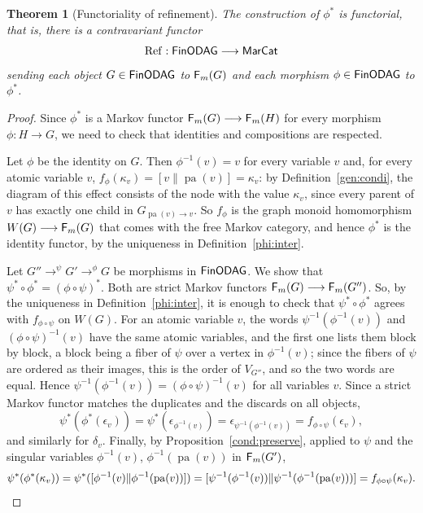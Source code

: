 \documentclass[12pt]{amsart}
\theoremstyle{plain}
\newtheorem{thm}{Theorem}[section]
\theoremstyle{definition}
\theoremstyle{remark}
\numberwithin{equation}{section}
\theoremstyle{plain}
\newcommand{\0}{\emptyset}
\newcommand{\fun}{\longrightarrow}
\newcommand{\cat}[1]{\textup{\textsf{#1}}}
\DeclareMathOperator{\cau}{\cat F_{\text{$m$}}}
\DeclareMathOperator{\pa}{pa}
\DeclareMathOperator{\intv}{Ref}
\begin{document}
%
%



\begin{thm}[Functoriality of refinement]\label{int:func}
The construction of $\phi^*$ is functorial, that is, there is a contravariant  functor
\[
\intv : \cat{FinODAG} \fun \cat{MarCat}
\]
sending each object  $G \in  \cat{FinODAG}$ to $\cau(G)$ and each morphism $\phi \in  \cat{FinODAG}$ to $\phi^*$.
\end{thm}
\begin{proof}
Since $\phi^*$ is a Markov functor $\cau(G) \fun \cau(H)$ for every morphism $\phi : H \fun G$, we need to check that identities and compositions are respected.

Let $\phi$ be the identity on $G$. Then $\phi^{-1}(v) = v$ for every variable $v$ and, for every atomic variable $v$, $f_\phi(\kappa_v) = [v \| \pa(v)] = \kappa_v$: by Definition~\ref{gen:condi}, the diagram of this effect consists of the node with the value $\kappa_v$, since every parent of $v$ has exactly one child in $G_{\pa(v) \rightarrow v}$. So $f_\phi$ is the graph monoid homomorphism $W(G) \fun \cau(G)$ that comes with the free Markov category, and hence $\phi^*$ is the identity functor, by the uniqueness in Definition~\ref{phi:inter}.

Let $G'' \to^\psi G' \to^\phi G$ be morphisms in $\cat{FinODAG}$. We show that $\psi^* \circ \phi^* = (\phi \circ \psi)^*$. Both are strict Markov functors $\cau(G) \fun \cau(G'')$. So, by the uniqueness in Definition~\ref{phi:inter}, it is enough to check that $\psi^* \circ \phi^*$ agrees with $f_{\phi \circ \psi}$ on $W(G)$. For an atomic variable $v$, the words $\psi^{-1}(\phi^{-1}(v))$ and $(\phi \circ \psi)^{-1}(v)$ have the same atomic variables, and the first one lists them block by block, a block being a fiber of $\psi$ over a vertex in $\phi^{-1}(v)$; since the fibers of $\psi$ are ordered as their images, this is the order of $V_{G''}$, and so the two words are equal. Hence $\psi^{-1}(\phi^{-1}(v)) = (\phi \circ \psi)^{-1}(v)$ for all variables $v$. Since a strict Markov functor matches the duplicates and the discards on all objects,
\[
\psi^*(\phi^*(\epsilon_v)) = \psi^*(\epsilon_{\phi^{-1}(v)}) = \epsilon_{\psi^{-1}(\phi^{-1}(v))} = f_{\phi \circ \psi}(\epsilon_v),
\]
and similarly for $\delta_v$. Finally, by Proposition~\ref{cond:preserve}, applied to $\psi$ and the singular variables $\phi^{-1}(v)$, $\phi^{-1}(\pa(v))$ in $\cau(G')$,
\[
\psi^*(\phi^*(\kappa_v)) = \psi^*([\phi^{-1}(v) \| \phi^{-1}(\pa(v))]) = [\psi^{-1}(\phi^{-1}(v)) \| \psi^{-1}(\phi^{-1}(\pa(v)))] = f_{\phi \circ \psi}(\kappa_v). \qedhere
\]
\end{proof}
\end{document}

